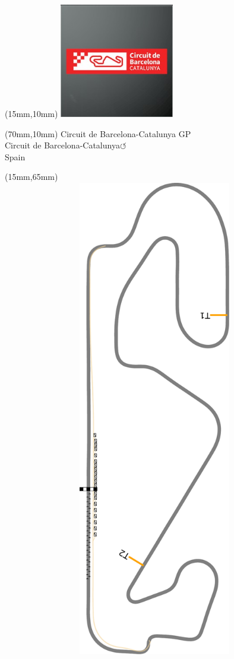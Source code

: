 \null\newpage
\begin{textblock*}{50mm}(15mm,10mm)%
\includegraphics[width=50mm]{LG/2015-05-20_00078.png}
\end{textblock*}
\begin{textblock*}{130mm}(70mm,10mm)%
{\fontsize{20}{20}\selectfont Circuit de Barcelona-Catalunya GP\\}
{\fontsize{16}{16}\selectfont Circuit de Barcelona-Catalunya\hfill \huge$\circlearrowleft$\\}
{\fontsize{12}{12}\selectfont Spain\\}
\end{textblock*}
\begin{textblock*}{185mm}(15mm,65mm)%
\centering
\mbox{\includegraphics[width=185mm,height=210mm,keepaspectratio]{PT/CBACGP.pdf}}
\end{textblock*}
